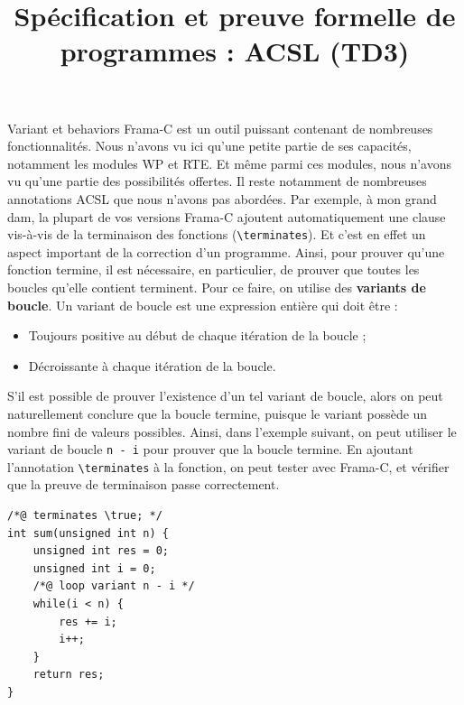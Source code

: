 \documentclass{article}
\title{Spécification et preuve formelle de programmes : ACSL (TD3)}
\date{}
\begin{document}
\maketitle

\vspace*{-0.5in}

\begin{Memo}{Variant et behaviors}{}
    Frama-C est un outil puissant contenant de nombreuses fonctionnalités.
    Nous n'avons vu ici qu'une petite partie de ses capacités, notamment les 
    modules WP et RTE.
    Et même parmi ces modules, nous n'avons vu qu'une partie des possibilités offertes.
    Il reste notamment de nombreuses annotations ACSL que nous n'avons pas abordées.
    Par exemple, à mon grand dam, la plupart de vos versions Frama-C ajoutent
    automatiquement une clause vis-à-vis de la terminaison des fonctions 
    (\texttt{\textbackslash terminates}).
    Et c'est en effet un aspect important de la correction d'un programme.
    Ainsi, pour prouver qu'une fonction termine, il est nécessaire, en particulier,
    de prouver que toutes les boucles qu'elle contient terminent.
    Pour ce faire, on utilise des \textbf{variants de boucle}.
    Un variant de boucle est une expression entière qui doit être :
    \begin{itemize}[label=$\bullet$]
        \item Toujours positive au début de chaque itération de la boucle ;
        \item Décroissante à chaque itération de la boucle.
    \end{itemize}
    S'il est possible de prouver l'existence d'un tel variant de boucle,
    alors on peut naturellement conclure que la boucle termine,
    puisque le variant possède un nombre fini de valeurs possibles.
    Ainsi, dans l'exemple suivant, on peut utiliser le variant de boucle
    \texttt{n - i} pour prouver que la boucle termine.
    En ajoutant l'annotation \texttt{\textbackslash terminates} à la fonction,
    on peut tester avec Frama-C, et vérifier que la preuve de terminaison
    passe correctement.
    \begin{MeCode}
        \begin{lstlisting}[style=CStyle]
/*@ terminates \true; */
int sum(unsigned int n) {
    unsigned int res = 0;
    unsigned int i = 0;
    /*@ loop variant n - i */
    while(i < n) {
        res += i;
        i++;
    }
    return res;
}
        \end{lstlisting}
    \end{MeCode}


\end{Memo}
\end{document}
